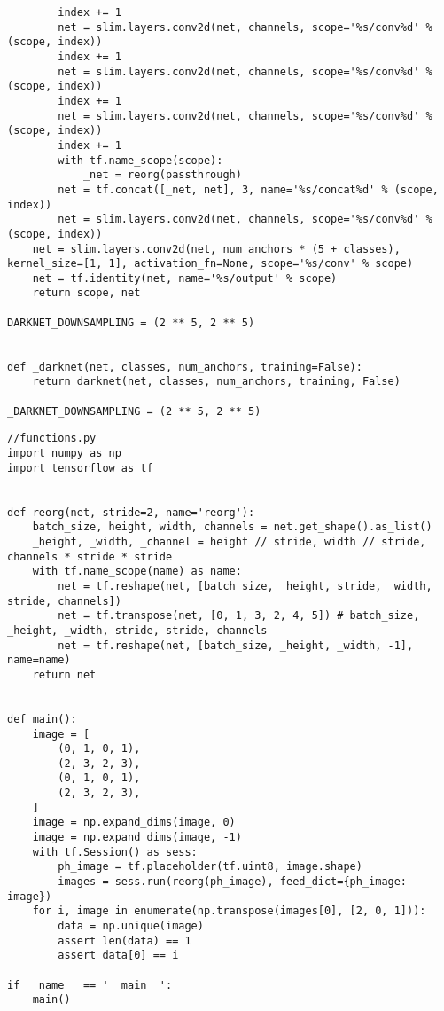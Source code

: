 \begin{lstlisting}
        index += 1
        net = slim.layers.conv2d(net, channels, scope='%s/conv%d' % (scope, index))
        index += 1
        net = slim.layers.conv2d(net, channels, scope='%s/conv%d' % (scope, index))
        index += 1
        net = slim.layers.conv2d(net, channels, scope='%s/conv%d' % (scope, index))
        index += 1
        with tf.name_scope(scope):
            _net = reorg(passthrough)
        net = tf.concat([_net, net], 3, name='%s/concat%d' % (scope, index))
        net = slim.layers.conv2d(net, channels, scope='%s/conv%d' % (scope, index))
    net = slim.layers.conv2d(net, num_anchors * (5 + classes), kernel_size=[1, 1], activation_fn=None, scope='%s/conv' % scope)
    net = tf.identity(net, name='%s/output' % scope)
    return scope, net

DARKNET_DOWNSAMPLING = (2 ** 5, 2 ** 5)


def _darknet(net, classes, num_anchors, training=False):
    return darknet(net, classes, num_anchors, training, False)

_DARKNET_DOWNSAMPLING = (2 ** 5, 2 ** 5)

\end{lstlisting}

\pagebreak
\begin{lstlisting}
//functions.py
import numpy as np
import tensorflow as tf


def reorg(net, stride=2, name='reorg'):
    batch_size, height, width, channels = net.get_shape().as_list()
    _height, _width, _channel = height // stride, width // stride, channels * stride * stride
    with tf.name_scope(name) as name:
        net = tf.reshape(net, [batch_size, _height, stride, _width, stride, channels])
        net = tf.transpose(net, [0, 1, 3, 2, 4, 5]) # batch_size, _height, _width, stride, stride, channels
        net = tf.reshape(net, [batch_size, _height, _width, -1], name=name)
    return net


def main():
    image = [
        (0, 1, 0, 1),
        (2, 3, 2, 3),
        (0, 1, 0, 1),
        (2, 3, 2, 3),
    ]
    image = np.expand_dims(image, 0)
    image = np.expand_dims(image, -1)
    with tf.Session() as sess:
        ph_image = tf.placeholder(tf.uint8, image.shape)
        images = sess.run(reorg(ph_image), feed_dict={ph_image: image})
    for i, image in enumerate(np.transpose(images[0], [2, 0, 1])):
        data = np.unique(image)
        assert len(data) == 1
        assert data[0] == i

if __name__ == '__main__':
    main()
\end{lstlisting}

